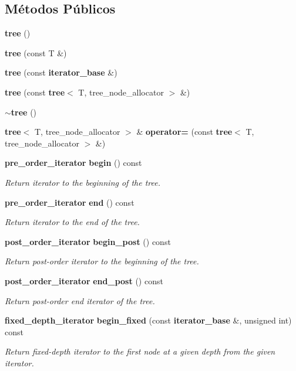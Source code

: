\subsection*{Métodos Públicos}
\begin{DoxyCompactItemize}
\item 
{\bf tree} ()
\item 
{\bf tree} (const T \&)
\item 
{\bf tree} (const {\bf iterator\+\_\+base} \&)
\item 
{\bf tree} (const {\bf tree}$<$ T, tree\+\_\+node\+\_\+allocator $>$ \&)
\item 
{\bf $\sim$tree} ()
\item 
{\bf tree}$<$ T, tree\+\_\+node\+\_\+allocator $>$ \& {\bf operator=} (const {\bf tree}$<$ T, tree\+\_\+node\+\_\+allocator $>$ \&)
\item 
{\bf pre\+\_\+order\+\_\+iterator} {\bf begin} () const 
\begin{DoxyCompactList}\small\item\em Return iterator to the beginning of the tree. \end{DoxyCompactList}\item 
{\bf pre\+\_\+order\+\_\+iterator} {\bf end} () const 
\begin{DoxyCompactList}\small\item\em Return iterator to the end of the tree. \end{DoxyCompactList}\item 
{\bf post\+\_\+order\+\_\+iterator} {\bf begin\+\_\+post} () const 
\begin{DoxyCompactList}\small\item\em Return post-\/order iterator to the beginning of the tree. \end{DoxyCompactList}\item 
{\bf post\+\_\+order\+\_\+iterator} {\bf end\+\_\+post} () const 
\begin{DoxyCompactList}\small\item\em Return post-\/order end iterator of the tree. \end{DoxyCompactList}\item 
{\bf fixed\+\_\+depth\+\_\+iterator} {\bf begin\+\_\+fixed} (const {\bf iterator\+\_\+base} \&, unsigned int) const 
\begin{DoxyCompactList}\small\item\em Return fixed-\/depth iterator to the first node at a given depth from the given iterator. \end{DoxyCompactList}\item 

\end{DoxyCompactItemize}
